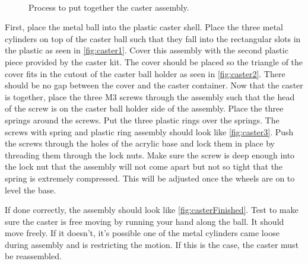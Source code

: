 \begin{figure}[h!]
\\
\caption{Process to put together the caster assembly.}
\label{fig:casterAssembly}
\end{figure}

First, place the metal ball into the plastic caster shell. Place the three metal cylinders on top of the caster ball such that they fall into the rectangular slots in the plastic as seen in \cref{fig:caster1}. Cover this assembly with the second plastic piece provided by the caster kit. The cover should be placed so the triangle of the cover fits in the cutout of the caster ball holder as seen in \cref{fig:caster2}. There should be no gap between the cover and the caster container. Now that the caster is together, place the three M3 screws through the assembly such that the head of the screw is on the caster ball holder side of the assembly. Place the three springs around the screws. Put the three plastic rings over the springs. The screws with spring and plastic ring assembly should look like \cref{fig:caster3}. Push the screws through the holes of the acrylic base and lock them in place by threading them through the lock nuts. Make sure the screw is deep enough into the lock nut that the assembly will not come apart but not so tight that the spring is extremely compressed. This will be adjusted once the wheels are on to level the base.

If done correctly, the assembly should look like \cref{fig:casterFinished}. Test to make sure the caster is free moving by running your hand along the ball. It should move freely. If it doesn't, it's possible one of the metal cylinders came loose during assembly and is restricting the motion. If this is the case, the caster must be reassembled.

